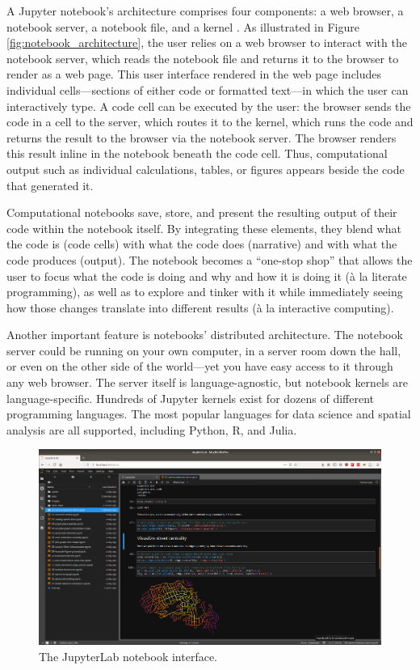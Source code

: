 \documentclass[11pt,letterpaper]{article}
\begin{document}
A Jupyter notebook's architecture comprises four components: a web browser, a notebook server, a notebook file, and a kernel \citep{kluyver_jupyter_2016}. As illustrated in Figure \ref{fig:notebook_architecture}, the user relies on a web browser to interact with the notebook server, which reads the notebook file and returns it to the browser to render as a web page. This user interface rendered in the web page includes individual cells---sections of either code or formatted text---in which the user can interactively type. A code cell can be executed by the user: the browser sends the code in a cell to the server, which routes it to the kernel, which runs the code and returns the result to the browser via the notebook server. The browser renders this result inline in the notebook beneath the code cell. Thus, computational output such as individual calculations, tables, or figures appears beside the code that generated it.

Computational notebooks save, store, and present the resulting output of their code within the notebook itself. By integrating these elements, they blend what the code is (code cells) with what the code does (narrative) and with what the code produces (output). The notebook becomes a \enquote{one-stop shop} that allows the user to focus what the code is doing and why and how it is doing it (à la literate programming), as well as to explore and tinker with it while immediately seeing how those changes translate into different results (à la interactive computing).

Another important feature is notebooks' distributed architecture. The notebook server could be running on your own computer, in a server room down the hall, or even on the other side of the world---yet you have easy access to it through any web browser. The server itself is language-agnostic, but notebook kernels are language-specific. Hundreds of Jupyter kernels exist for dozens of different programming languages. The most popular languages for data science and spatial analysis are all supported, including Python, R, and Julia.

\begin{figure}[tbp]
	\centering
	\includegraphics[width=1\textwidth]{jupyterlab-interface.png}
	\caption{The JupyterLab notebook interface.}
	\label{fig:jupyterlab_interface}
\end{figure}
\end{document}
